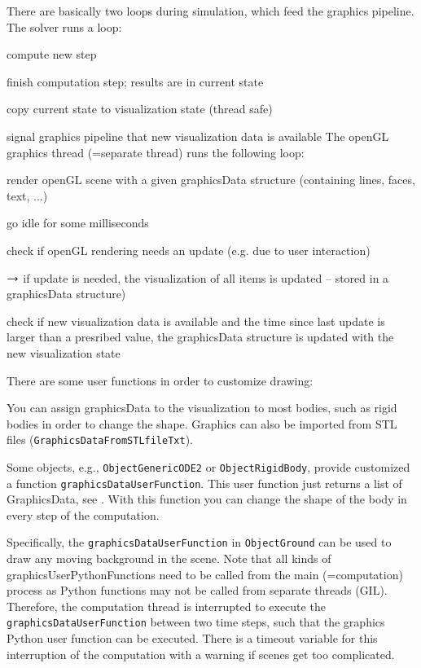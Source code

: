 There are basically two loops during simulation, which feed the graphics pipeline.
The solver runs a loop:
\bi
  \item compute new step
	\item finish computation step; results are in current state
	\item copy current state to visualization state (thread safe)
	\item signal graphics pipeline that new visualization data is available
\ei
The openGL graphics thread (=separate thread) runs the following loop:
\bi
  \item render openGL scene with a given graphicsData structure (containing lines, faces, text, ...)
  \item go idle for some milliseconds
	\item check if openGL rendering needs an update (e.g. due to user interaction)
	\item[] $\rightarrow$ if update is needed, the visualization of all items is updated -- stored in a graphicsData structure)
	\item check if new visualization data is available and the time since last update is larger than a presribed value, the graphicsData structure is updated with the new visualization state
\ei

There are some user functions in order to customize drawing:
\bi
	\item You can assign graphicsData to the visualization to most bodies, such as rigid bodies in order to change the shape. Graphics can also be imported from STL files (\texttt{GraphicsDataFromSTLfileTxt}).
	\item Some objects, e.g., \texttt{ObjectGenericODE2} or \texttt{ObjectRigidBody}, provide customized a function \texttt{graphicsDataUserFunction}. This user function just returns a list of GraphicsData, see . With this function you can change the shape of the body in every step of the computation.
	\item Specifically, the \texttt{graphicsDataUserFunction} in \texttt{ObjectGround} can be used to draw any moving background in the scene.
\ei
Note that all kinds of graphicsUserPythonFunctions need to be called from the main (=computation) process as Python functions may not be called from separate threads (GIL). Therefore, the computation thread is interrupted to execute the \texttt{graphicsDataUserFunction} between two time steps, such that the graphics Python user function can be executed. There is a timeout variable for this interruption of the computation with a warning if scenes get too complicated.


